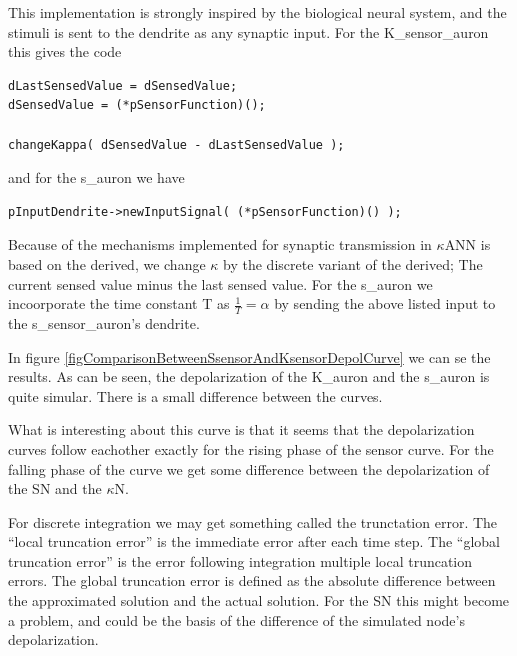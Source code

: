 This implementation is strongly inspired by the biological neural system, and the stimuli is sent to the dendrite as any synaptic input.
For the K\_sensor\_auron this gives the code
\begin{lstlisting}
dLastSensedValue = dSensedValue;
dSensedValue = (*pSensorFunction)();

changeKappa( dSensedValue - dLastSensedValue ); 
\end{lstlisting} %
and for the s\_auron we have %
\begin{lstlisting}
pInputDendrite->newInputSignal( (*pSensorFunction)() );  
\end{lstlisting} %


Because of the mechanisms implemented for synaptic transmission in $\kappa$ANN is based on the derived, we change $\kappa$ by the discrete variant of the derived; 
The current sensed value minus the last sensed value.%
For the s\_auron we incoorporate the time constant T as $\frac{1}{T} = \alpha$ %
		by sending the above listed input to the s\_sensor\_auron's dendrite.


In figure \ref{figComparisonBetweenSsensorAndKsensorDepolCurve} we can se the results. 
As can be seen, the depolarization of the K\_auron and the s\_auron is quite simular.
There is a small difference between the curves.

What is interesting about this curve is that it seems that the depolarization curves follow eachother exactly %
for the rising phase of the sensor curve. For the falling phase of the curve we get some difference between the depolarization of the SN and the $\kappa$N.

For discrete integration we may get something called the trunctation error. The ``local truncation error'' is the immediate error after each time step. 
The ``global truncation error'' is the error following integration multiple local truncation errors. %
The global truncation error is defined as the absolute difference between the approximated solution and the actual solution. 
For the SN this might become a problem, and could be the basis of the difference of the simulated node's depolarization.%


